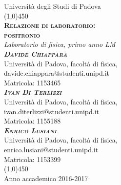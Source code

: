 
\begin{titlepage}

\begin{center}
\LARGE{Università degli Studi di Padova}\\
\line(1,0){450}\\
\vspace{1em}
\Huge{\textsc{\textbf{Relazione di laboratorio:\\ positronio}}}\\
\vspace{2em}
\LARGE{\textit{Laboratorio di fisica, primo anno LM}}\\
\vspace{4em}
\huge{\textbf\textsc\textit{{{Davide Chiappara}}}}\\
\vspace{0.5em}
\normalsize{Università di Padova, facoltà di fisica,}\\
\normalsize{davide.chiappara@studenti.unipd.it}\\
\normalsize{Matricola: 1153465}\\
\vspace{1em}
\huge{\textbf\textsc\textit{{{Ivan Di Terlizzi}}}}\\
\vspace{0.5em}
\normalsize{Università di Padova, facoltà di fisica,}\\
\normalsize{ivan.diterlizzi@studenti.unipd.it}\\
\normalsize{Matricola: 1155188}\\
\vspace{1em}
\huge{\textbf\textsc\textit{{{Enrico Lusiani}}}}\\
\vspace{0.5em}
\normalsize{Università di Padova, facoltà di fisica,}\\
\normalsize{enrico.lusiani@studenti.unipd.it}\\
\normalsize{Matricola: 1153399}\\
\vfill
\line(1,0){450}\\
\LARGE{Anno accademico 2016-2017}
\end{center}

\end{titlepage}

